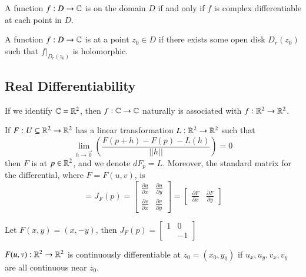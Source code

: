 \documentclass[12pt, a4paper, oneside, openright, titlepage]{book}
\begin{document}
\begin{defn}
    A function $f:D\rightarrow \mathbb C$ is  on the domain $D$ if and only if $f$ is complex differentiable at each point in $D$.
\end{defn}


\begin{defn}
    A function $f:D\rightarrow \mathbb C$ is  at a point $z_0 \in D$ if there exists some open disk $D_r(z_0)$ such that $f\vert_{D_r(z_0)}$ is holomorphic.
\end{defn}

\subsection{Real Differentiability}

If we identify $\mathbb C=\mathbb R^2$, then $f:\mathbb C\rightarrow \mathbb C$ naturally is associated with $f:\mathbb R^2\rightarrow \mathbb R^2$.

\begin{defn}
    If $F:U\subseteq \mathbb R^2\rightarrow\mathbb R^2$ has a linear transformation $L:\mathbb R^2\rightarrow \mathbb R^2$ such that \begin{equation*}
        \lim\limits_{h\rightarrow \vec{0}}\left(\frac{F(p+h)-F(p)-L(h)}{||h||}\right) = 0
    \end{equation*}
    then $F$ is  at $p \in \mathbb R^2$, and we denote $dF_p = L$. Moreover, the standard matrix for the differential, where $F= F(u,v)$, is \begin{equation*}
        [dF_p] = J_F(p) = \begin{bmatrix} \frac{\partial u}{\partial x} & \frac{\partial u}{\partial y} \\ \frac{\partial v}{\partial x} & \frac{\partial v}{\partial y}\end{bmatrix} = \left[\begin{array}{c|c} \frac{\partial F}{\partial x} & \frac{\partial F}{\partial y}\end{array}\right]
    \end{equation*}
\end{defn}

\begin{eg}
    Let $F(x,y) = (x,-y)$, then  $J_F(p) = \begin{bmatrix} 1 & 0 \\ & -1\end{bmatrix}$
\end{eg}

\begin{defn}
    $F(u,v):\mathbb R^2\rightarrow \mathbb R^2$ is continuously differentiable at $z_0 = (x_0,y_0)$ if $u_x,u_y,v_x,v_y$ are all continuous near $z_0$.
\end{defn}
\end{document}
